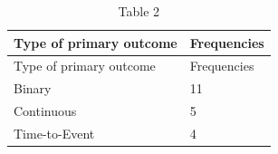 \documentclass[]{article}
\begin{document}
\begin{longtable}[]{@{}ll@{}}
\caption{Table 2}\tabularnewline
\toprule
\begin{minipage}[b]{0.34\columnwidth}\raggedright
Type of primary outcome\strut
\end{minipage} & \begin{minipage}[b]{0.18\columnwidth}\raggedright
Frequencies\strut
\end{minipage}\tabularnewline
\midrule
\endfirsthead
\toprule
\begin{minipage}[b]{0.34\columnwidth}\raggedright
Type of primary outcome\strut
\end{minipage} & \begin{minipage}[b]{0.18\columnwidth}\raggedright
Frequencies\strut
\end{minipage}\tabularnewline
\midrule
\endhead
\begin{minipage}[t]{0.34\columnwidth}\raggedright
Binary\strut
\end{minipage} & \begin{minipage}[t]{0.18\columnwidth}\raggedright
11\strut
\end{minipage}\tabularnewline
\begin{minipage}[t]{0.34\columnwidth}\raggedright
Continuous\strut
\end{minipage} & \begin{minipage}[t]{0.18\columnwidth}\raggedright
5\strut
\end{minipage}\tabularnewline
\begin{minipage}[t]{0.34\columnwidth}\raggedright
Time-to-Event\strut
\end{minipage} & \begin{minipage}[t]{0.18\columnwidth}\raggedright
4\strut
\end{minipage}\tabularnewline
\bottomrule
\end{longtable}
\end{document}
